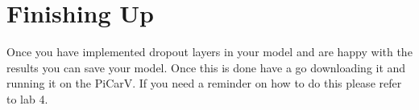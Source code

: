 \documentclass[11pt]{report}
\begin{document}

\chapter{Finishing Up}
Once you have implemented dropout layers in your model and are happy with the results you can save your model. Once this is done have a go downloading it and running it on the PiCarV. If you need a reminder on how to do this please refer to lab 4.
\end{document}
